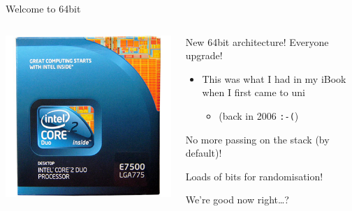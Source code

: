 \documentclass[9pt,aspectratio=169]{beamer}
\begin{document}
\begin{frame}[label={sec:orgda7276f},fragile]{Welcome to 64bit}
 \begin{columns}
\begin{column}[t]{0.49\columnwidth}
\begin{center}
\includegraphics[width=.9\linewidth]{./64bit.jpg}
\end{center}
\end{column}

\begin{column}[t]{0.49\columnwidth}
New 64bit architecture!  Everyone upgrade!
\begin{itemize}
\item This was what I had in my iBook when I first came to uni
\begin{itemize}
\item (back in 2006 \texttt{:-(})
\end{itemize}
\end{itemize}

No more passing on the stack (by default)!

Loads of bits for randomisation!

\begin{block}{We're good now right\ldots{}?}
\end{block}
\end{column}
\end{columns}
\end{frame}
\end{document}
